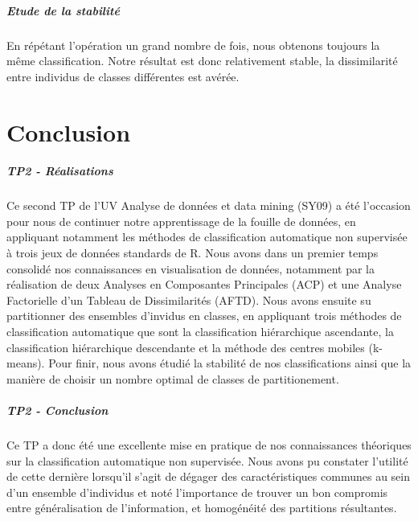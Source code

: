 \documentclass{report}
\begin{document}
\paragraph{Etude de la stabilité}
En répétant l'opération un grand nombre de fois, nous obtenons toujours la même classification. Notre résultat est donc relativement stable, la dissimilarité entre individus de classes différentes est avérée.
\chapter{Conclusion}
\paragraph{TP2 - Réalisations}
Ce second TP de l'UV Analyse de données et data mining (SY09) a été l'occasion pour nous de continuer notre apprentissage de la fouille de données, en appliquant notamment les méthodes de classification automatique non supervisée à trois jeux de données standards de R. Nous avons dans un premier temps consolidé nos connaissances en visualisation de données, notamment par la réalisation de deux Analyses en Composantes Principales (ACP) et une Analyse Factorielle d'un Tableau de Dissimilarités (AFTD). Nous avons ensuite su partitionner des ensembles d'invidus en classes, en appliquant trois méthodes de classification automatique que sont la classification hiérarchique ascendante, la classification hiérarchique descendante et la méthode des centres mobiles (k-means). Pour finir, nous avons étudié la stabilité de nos classifications ainsi que la manière de choisir un nombre optimal de classes de partitionement.
\paragraph{TP2 - Conclusion}
Ce TP a donc été une excellente mise en pratique de nos connaissances théoriques sur la classification automatique non supervisée. Nous avons pu constater l'utilité de cette dernière lorsqu'il s'agit de dégager des caractéristiques communes au sein d'un ensemble d'individus et noté l'importance de trouver un bon compromis entre généralisation de l'information, et homogénéité des partitions résultantes.
\end{document}
